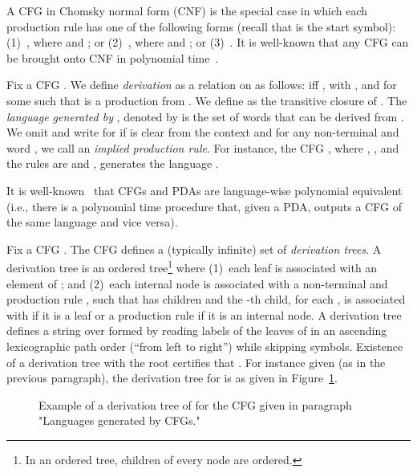 \documentclass{CSML}
\begin{document}
A CFG in Chomsky normal form (CNF) is the special case in which each production rule  has one of the following forms (recall that  is the start symbol): (1)~, where  and ; or (2)~, where  and ; or (3)~. It is well-known that any CFG can be brought onto CNF in polynomial time~\cite{C59}.

 Fix a CFG . We define \emph{derivation}  as a relation on  as follows:
 iff , with , and  for some  such that  is a production from .
We define  as the transitive closure of . The \emph{language generated by }, denoted by  is the set of words that can be derived from .  
We omit  and write  for  if  is clear from the context and for any non-terminal  and word , we call  an {\em implied production rule}.
For instance, the CFG , where ,  , and the rules  are  and , generates the language .

 It is well-known~\cite{HU79} that CFGs and PDAs are language-wise polynomial equivalent (i.e., there is a polynomial time procedure that, given a PDA,  outputs a CFG of the same language and vice versa).

Fix a CFG . The CFG defines a (typically infinite) set of {\em derivation trees}. 
A derivation tree is an ordered tree\footnote{In an ordered tree, children 
of every node are ordered.} where (1)~each leaf is associated with an element of ; and (2)~each internal node  is associated with a non-terminal  and production rule , such that  has  children and the -th child, for each , is associated with  if it is a leaf or
a production rule  if it is an internal node.
A derivation tree  defines a string  over  formed by reading labels of the leaves of  in an ascending lexicographic path order (``from left to right'') while skipping  symbols. Existence of a derivation tree  with the root  certifies that 
. 
For instance given  (as in the previous paragraph), the  derivation tree for  is as given in Figure~\ref{fig:ex}.

\begin{figure}
\center
{}
\caption{\label{fig:ex}Example of a derivation tree of  for the CFG  given in paragraph "Languages generated by CFGs."}
\end{figure}
\end{document}

